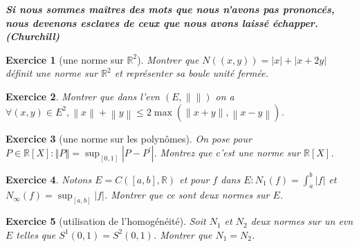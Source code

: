 \documentclass[12pt,a4paper]{article}
\newcommand{\norme}[1]{\left\lVert#1\right\rVert}
\newcommand{\R}{\mathbb{R}}
\theoremstyle{break}
\theoremstyle{break}
\newtheorem{Exo}{Exercice}
\begin{document}
%
\emph{\textbf{\og Si nous sommes maîtres des mots que nous n’avons pas prononcés, nous devenons esclaves de ceux que nous avons laissé échapper.\fg  (Churchill)}}
%


	\begin{Exo}[une norme sur $\R^2$]
	Montrer que $N((x,y))=|x|+|x+2y|$ définit une norme sur $\R^2$ et représenter sa boule unité fermée.
\end{Exo}

 \begin{Exo}
	Montrer que dans l'evn $(E,\norme{})$ on a 
$\forall(x,y)\in E^2,\norme{x}+\norme{y}\leqslant 2\max\left(\norme{x+y},\norme{x-y}\right)$.
\end{Exo}




 \begin{Exo}[une norme sur les polynômes]
		On pose pour $P\in \mathbb{R}\left[ X\right] :\left\Vert P\right\Vert
=\sup_{\left[ 0,1\right] }\left\vert P-P^{\prime }\right\vert .$ Montrez
que c'est une norme sur $\mathbb{R}\left[ X\right]$.
\end{Exo}

\begin{Exo}
	Notons $E=C\left([a,b],\R\right)$ et pour $f$ dans $E:N_1(f)=\int_a^b|f|$ et $N_{\infty}(f)=\sup_{[a,b]}|f|$. Montrer que ce sont deux normes sur $E$.
\end{Exo}

\begin{Exo}[utilisation de l'homogénéité]
Soit $N_{1}$ et $N_{2}$ deux normes sur un evn $E$ telles que $S^1\left(0,1\right)=S^{2}\left( 0,1\right)$. 
Montrer que $N_{1}=N_{2}$. 
\end{Exo}
\end{document}
